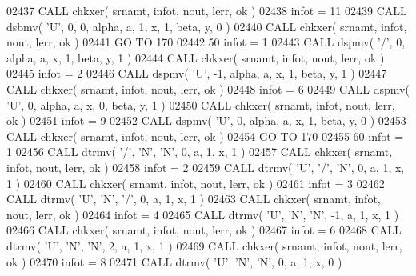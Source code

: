 \begin{DoxyCode}
02437       \textcolor{keyword}{CALL }chkxer( srnamt, infot, nout, lerr, ok )
02438       infot = 11
02439       \textcolor{keyword}{CALL }dsbmv( \textcolor{stringliteral}{'U'}, 0, 0, alpha, a, 1, x, 1, beta, y, 0 )
02440       \textcolor{keyword}{CALL }chkxer( srnamt, infot, nout, lerr, ok )
02441       \textcolor{keywordflow}{GO TO} 170
02442    50 infot = 1
02443       \textcolor{keyword}{CALL }dspmv( \textcolor{stringliteral}{'/'}, 0, alpha, a, x, 1, beta, y, 1 )
02444       \textcolor{keyword}{CALL }chkxer( srnamt, infot, nout, lerr, ok )
02445       infot = 2
02446       \textcolor{keyword}{CALL }dspmv( \textcolor{stringliteral}{'U'}, -1, alpha, a, x, 1, beta, y, 1 )
02447       \textcolor{keyword}{CALL }chkxer( srnamt, infot, nout, lerr, ok )
02448       infot = 6
02449       \textcolor{keyword}{CALL }dspmv( \textcolor{stringliteral}{'U'}, 0, alpha, a, x, 0, beta, y, 1 )
02450       \textcolor{keyword}{CALL }chkxer( srnamt, infot, nout, lerr, ok )
02451       infot = 9
02452       \textcolor{keyword}{CALL }dspmv( \textcolor{stringliteral}{'U'}, 0, alpha, a, x, 1, beta, y, 0 )
02453       \textcolor{keyword}{CALL }chkxer( srnamt, infot, nout, lerr, ok )
02454       \textcolor{keywordflow}{GO TO} 170
02455    60 infot = 1
02456       \textcolor{keyword}{CALL }dtrmv( \textcolor{stringliteral}{'/'}, \textcolor{stringliteral}{'N'}, \textcolor{stringliteral}{'N'}, 0, a, 1, x, 1 )
02457       \textcolor{keyword}{CALL }chkxer( srnamt, infot, nout, lerr, ok )
02458       infot = 2
02459       \textcolor{keyword}{CALL }dtrmv( \textcolor{stringliteral}{'U'}, \textcolor{stringliteral}{'/'}, \textcolor{stringliteral}{'N'}, 0, a, 1, x, 1 )
02460       \textcolor{keyword}{CALL }chkxer( srnamt, infot, nout, lerr, ok )
02461       infot = 3
02462       \textcolor{keyword}{CALL }dtrmv( \textcolor{stringliteral}{'U'}, \textcolor{stringliteral}{'N'}, \textcolor{stringliteral}{'/'}, 0, a, 1, x, 1 )
02463       \textcolor{keyword}{CALL }chkxer( srnamt, infot, nout, lerr, ok )
02464       infot = 4
02465       \textcolor{keyword}{CALL }dtrmv( \textcolor{stringliteral}{'U'}, \textcolor{stringliteral}{'N'}, \textcolor{stringliteral}{'N'}, -1, a, 1, x, 1 )
02466       \textcolor{keyword}{CALL }chkxer( srnamt, infot, nout, lerr, ok )
02467       infot = 6
02468       \textcolor{keyword}{CALL }dtrmv( \textcolor{stringliteral}{'U'}, \textcolor{stringliteral}{'N'}, \textcolor{stringliteral}{'N'}, 2, a, 1, x, 1 )
02469       \textcolor{keyword}{CALL }chkxer( srnamt, infot, nout, lerr, ok )
02470       infot = 8
02471       \textcolor{keyword}{CALL }dtrmv( \textcolor{stringliteral}{'U'}, \textcolor{stringliteral}{'N'}, \textcolor{stringliteral}{'N'}, 0, a, 1, x, 0 )

\end{DoxyCode}
